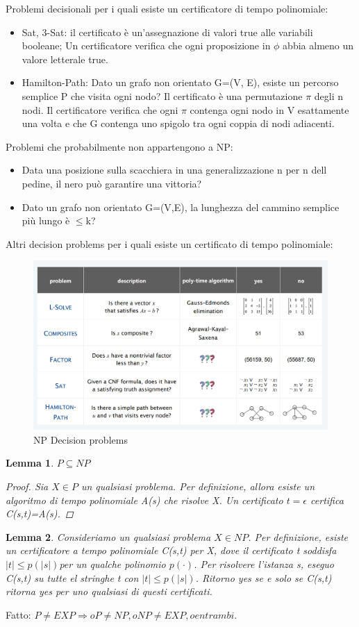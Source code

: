 \documentclass{article}
\newtheorem{lemma}{Lemma}[subsection]
\begin{document}
Problemi decisionali per i quali esiste un certificatore di tempo polinomiale:
\begin{itemize}
    \item Sat, 3-Sat: il certificato è un'assegnazione di valori true alle variabili booleane; Un certificatore verifica che ogni proposizione in $\phi$ abbia almeno un valore letterale true.
    \item Hamilton-Path: Dato un grafo non orientato G=(V, E), esiste un percorso semplice P che visita ogni nodo? Il certificato è una permutazione $\pi$ degli n nodi. Il certificatore verifica che ogni $\pi$ contenga ogni nodo in V esattamente una volta e che G contenga uno spigolo tra ogni coppia di nodi adiacenti.
\end{itemize}
Problemi che probabilmente non appartengono a NP:
\begin{itemize}
    \item Data una posizione sulla scacchiera in una generalizzazione n per n dell pedine, il nero può garantire una vittoria?
    \item Dato un grafo non orientato G=(V,E), la lunghezza del cammino semplice più lungo è $\leq$k?
\end{itemize}
Altri decision problems per i quali esiste un certificato di tempo polinomiale:
\begin{figure}[H]
    \centering
    \includegraphics[width=0.5\linewidth]{DecisionProblemsNP.png}
    \caption{NP Decision problems}
    \label{fig:enter-label}
\end{figure}

\begin{lemma}
    $P\subseteq NP$
    \begin{proof}
        Sia $X\in P$ un qualsiasi problema. Per definizione, allora esiste un algoritmo di tempo polinomiale A(s) che risolve X. Un certificato $t=\epsilon$ certifica C(s,t)=A(s).
    \end{proof}
\end{lemma}
\begin{lemma}
    Consideriamo un qualsiasi problema $X\in NP$. Per definizione, esiste un certificatore a tempo polinomiale C(s,t) per X, dove il certificato t soddisfa $|t|\leq p(|s|)$per un qualche polinomio $p(\cdot)$. Per risolvere l'istanza s, eseguo C(s,t) su tutte el stringhe t con $|t|\leq p(|s|)$. Ritorno yes se e solo se C(s,t) ritorna yes per uno qualsiasi di questi certificati.
\end{lemma}
\noindent Fatto: $P\neq EXP \Rightarrow o P\neq NP, o NP\neq EXP, o entrambi$.
\end{document}
